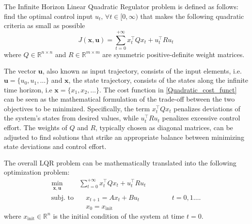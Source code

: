 \documentclass[a4paper,12pt,oneside]{book}
\begin{document}
\bigskip
The Infinite Horizon Linear Quadratic Regulator problem is defined as follows:
find the optimal control input $u_t, \, \forall t \in [0, \infty)$ that makes the following quadratic criteria as small as possible
\begin{equation}
    J(\boldsymbol{x}, \boldsymbol{u})  = \sum_{t=0} ^{+\infty} x_t^\top Q x_t + u_t ^\top R u_t
\label{Quadratic_cost_funct}
\end{equation}
where $Q \in \mathbb{R}^{n \times n}$ and $R \in \mathbb{R}^{m \times m}$ are symmetric positive-definite weight matrices.

The vector $\boldsymbol{u}$, also known as input trajectory, consists of the input elements, i.e. $\boldsymbol{u} = \{u_0, u_1, \dots\}$ and $\boldsymbol{x}$, the state trajectory, consists of the states along the infinite time horizon, i.e $\boldsymbol{x} = \{x_1, x_2, \dots\}$.
The cost function in \eqref{Quadratic_cost_funct} can be seen as the mathematical formulation of the trade-off between the two objectives to be minimized.
Specifically, the term $x_t^\top Q x_t$ penalizes deviations of the system's states from desired values, while $u_t^\top R u_t$ penalizes excessive control effort.
The weights of $Q$ and $R$, typically chosen as diagonal matrices, can be adjusted to find solutions that strike an appropriate balance between minimizing state deviations and control effort.

\bigskip
The overall LQR problem can be mathematically translated into the following optimization problem:
\begin{equation}
\begin{aligned}
	\min_{\substack{\boldsymbol{x}, \boldsymbol{u}}}\quad & \sum_{t=0}^{+\infty}  x_t ^\top Q x_t  + u_t^\top R u_t  \\
	\text{subj. to} & \quad x_{t+1}  = A x_t + B u_t \hspace{2cm} t = 0, 1 \ldots. \\
    & \quad x_0 = x_{\text{init}}
\end{aligned}
\label{eq:LQR_1}
\end{equation}
where  $x_{\text{init}} \in \mathbb{R}^n$ is the initial condition of the system at time $t=0$.
\end{document}
